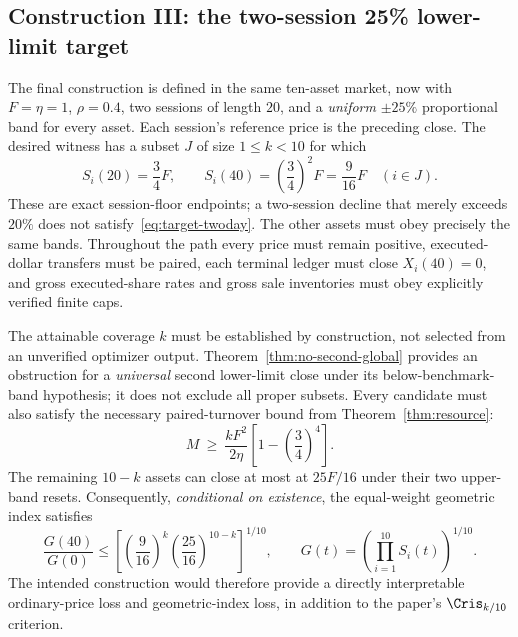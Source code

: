 \documentclass[review,hidelinks,onefignum,onetabnum]{siamonline250211}
\begin{document}
\subsection{Construction III: the two-session 25\% lower-limit target}\label{subsec:two-day-limit}
The final construction is defined in the same ten-asset market, now with $F=\eta=1$, $\rho=0.4$, two sessions of length $20$, and a \emph{uniform} $\pm25\%$ proportional band for every asset. Each session's reference price is the preceding close. The desired witness has a subset $J$ of size $1\le k<10$ for which
\begin{equation}\label{eq:target-twoday}
 S_i(20)=\frac34F,\qquad
 S_i(40)=\left(\frac34\right)^2F=\frac9{16}F
 \quad(i\in J).
\end{equation}
These are exact session-floor endpoints; a two-session decline that merely exceeds $20\%$ does not satisfy~\eqref{eq:target-twoday}. The other assets must obey precisely the same bands. Throughout the path every price must remain positive, executed-dollar transfers must be paired, each terminal ledger must close $X_i(40)=0$, and gross executed-share rates and gross sale inventories must obey explicitly verified finite caps.

The attainable coverage $k$ must be established by construction, not selected from an unverified optimizer output. Theorem~\ref{thm:no-second-global} provides an obstruction for a \emph{universal} second lower-limit close under its below-benchmark-band hypothesis; it does not exclude all proper subsets. Every candidate must also satisfy the necessary paired-turnover bound from Theorem~\ref{thm:resource}:
\begin{equation}\label{eq:two-day-resource-target}
 M\ \ge\ \frac{kF^2}{2\eta}
           \left[1-\left(\frac34\right)^4\right].
\end{equation}
The remaining $10-k$ assets can close at most at $25F/16$ under their two upper-band resets. Consequently, \emph{conditional on existence}, the equal-weight geometric index satisfies
\begin{equation}\label{eq:two-day-index-target}
 \frac{G(40)}{G(0)}
 \le
 \left[\left(\frac9{16}\right)^k
       \left(\frac{25}{16}\right)^{10-k}\right]^{1/10},
 \qquad
 G(t)=\left(\prod_{i=1}^{10}S_i(t)\right)^{1/10}.
\end{equation}
The intended construction would therefore provide a directly interpretable ordinary-price loss and geometric-index loss, in addition to the paper's $\Cris_{k/10}$ criterion.
\end{document}
